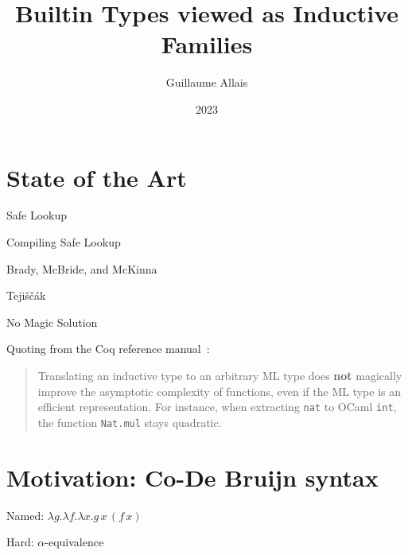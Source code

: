 \documentclass{beamer}
\title{Builtin Types viewed as Inductive Families}
\author{Guillaume Allais}
\institute{University of Strathclyde \\ Glasgow, UK}
\date{2023}
\begin{document}
\begin{frame}
  \maketitle
\end{frame}

\section{State of the Art}

\begin{frame}{Safe Lookup}


\end{frame}

\begin{frame}{Compiling Safe Lookup}

Brady, McBride, and McKinna~\cite{DBLP:conf/types/BradyMM03}


Tejiščák~\cite{DBLP:journals/pacmpl/Tejiscak20}

\end{frame}

\begin{frame}{No Magic Solution}

Quoting from the Coq reference manual~\cite{Coq:manual}:\bigskip

\begin{quote}
Translating an inductive type to an arbitrary ML type
does \textbf{not} magically improve the asymptotic complexity of
functions, even if the ML type is an efficient representation.
For instance, when extracting \texttt{nat} to OCaml \texttt{int}, the
function \texttt{Nat.mul} stays quadratic.
\end{quote}
\end{frame}

\section{Motivation: Co-De Bruijn syntax}

\begin{frame}{Named: $\lambda{}g.\lambda{}f.\lambda{}x.g\,x\,(f\,x)$}


\vfill
Hard: $\alpha$-equivalence
\end{frame}
\end{document}
